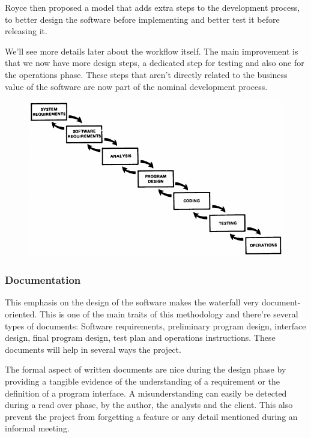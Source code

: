 Royce then proposed a model that adds extra steps to the development process,
to better design the software before implementing and better test it before
releasing it.

We'll see more details later about the workflow itself.
The main improvement is that we now have more design steps, a dedicated step
for testing and also one for the operations phase.
These steps that aren't directly related to the business value of the
software are now part of the nominal development process.

\begin{figure}
    \includegraphics[width=\textwidth]{../../resources/images/waterfall/waterfall.PNG}
    \centering
\end{figure}

\subsubsection{Documentation}

This emphasis on the design of the software makes the waterfall very
document-oriented.
This is one of the main traits of this methodology and there're several
types of documents:
Software requirements, preliminary program design, interface design, final
program design, test plan and operations instructions.
These documents will help in several ways the project.

The formal aspect of written documents are nice during the design
phase by providing a tangible evidence of the understanding of a
requirement or the definition of a program interface.
A misunderstanding can easily be detected during a read over phase, by the
author, the analysts and the client.
This also prevent the project from forgetting a feature or any detail mentioned
during an informal meeting.

